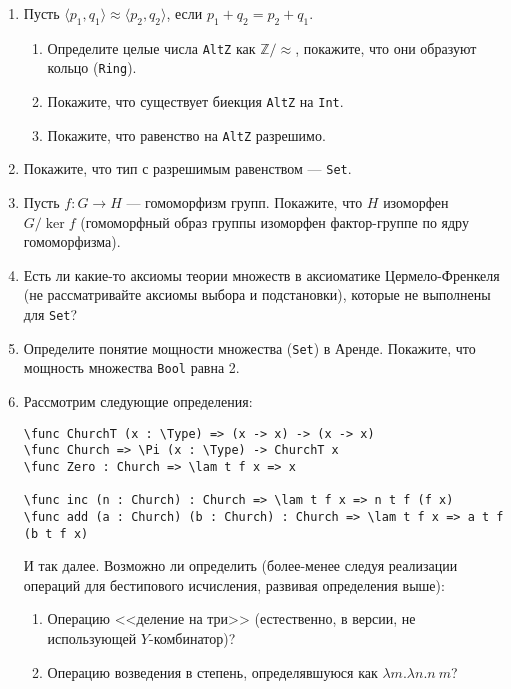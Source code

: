 \documentclass[10pt,a4paper,oneside]{article}
\begin{document}
\begin{enumerate}
\item Пусть $\langle p_1,q_1 \rangle \approx \langle p_2,q_2 \rangle$, если $p_1 + q_2 = p_2 + q_1$.
\begin{enumerate}
\item Определите целые числа \verb!AltZ! как $\mathbb{Z}/\approx$, покажите, что они образуют кольцо (\verb!Ring!). 
\item Покажите, что существует биекция \verb!AltZ! на \verb!Int!.
\item Покажите, что равенство на \verb!AltZ! разрешимо.
\end{enumerate}
\item Покажите, что тип с разрешимым равенством --- \verb!Set!.
\item Пусть $f : G \rightarrow H$ --- гомоморфизм групп. Покажите, что $H$ изоморфен $G/\ker f$ (гомоморфный образ группы
изоморфен фактор-группе по ядру гомоморфизма).
\item Есть ли какие-то аксиомы теории множеств в аксиоматике Цермело-Френкеля (не рассматривайте аксиомы выбора и подстановки), 
которые не выполнены для \verb!Set!?
\item Определите понятие мощности множества (\verb!Set!) в Аренде. Покажите, что мощность множества \verb!Bool! равна 2.
\item Рассмотрим следующие определения:
\begin{verbatim}
\func ChurchT (x : \Type) => (x -> x) -> (x -> x)
\func Church => \Pi (x : \Type) -> ChurchT x
\func Zero : Church => \lam t f x => x

\func inc (n : Church) : Church => \lam t f x => n t f (f x)
\func add (a : Church) (b : Church) : Church => \lam t f x => a t f (b t f x)
\end{verbatim}

И так далее. Возможно ли определить (более-менее следуя реализации операций для бестипового исчисления,
развивая определения выше):
\begin{enumerate}
\item Операцию <<деление на три>> (естественно, в версии, не использующей $Y$-комбинатор)?
\item Операцию возведения в степень, определявшуюся как $\lambda m.\lambda n.n\ m$?
\end{enumerate}
\end{enumerate}
                               
\end{document}
